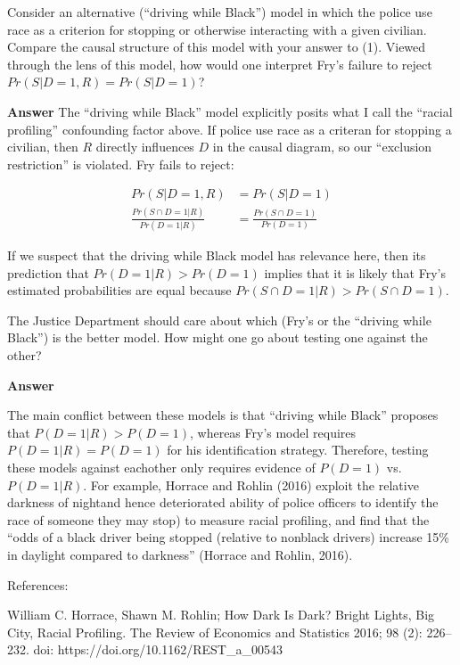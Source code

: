 \documentclass[11pt]{exam}
\begin{document}
\begin{questions}
    \question Consider an alternative (``driving while Black'') model in
which the police use race as a criterion for stopping or otherwise
interacting with a given civilian. Compare the causal structure of this
model with your answer to (1). Viewed through the lens of this model,
how would one interpret Fry's failure to reject
\(Pr(S|D = 1, R) = Pr(S|D = 1)\)?

\textbf{Answer} The ``driving while Black'' model explicitly posits what
I call the ``racial profiling'' confounding factor above. If police use
race as a criteran for stopping a civilian, then \(R\) directly
influences \(D\) in the causal diagram, so our ``exclusion restriction''
is violated. Fry fails to reject:

\begin{align*} Pr(S|D = 1, R) &= Pr(S|D = 1) \\ \frac{Pr(S\cap D = 1|R)}{Pr(D=1|R)} &= \frac{Pr(S\cap D = 1)}{Pr(D=1)} \end{align*}

If we suspect that the driving while Black model has relevance here,
then its prediction that \(Pr(D=1|R) > Pr(D=1)\) implies that it is
likely that Fry's estimated probabilities are equal because
\(Pr(S\cap D = 1|R) > Pr(S\cap D = 1)\).

    \question The Justice Department should care about which (Fry's or
the ``driving while Black'') is the better model. How might one go about
testing one against the other?

\textbf{Answer}

The main conflict between these models is that ``driving while Black''
proposes that \(P(D = 1 | R) > P(D = 1)\), whereas Fry's model requires
\(P(D = 1 | R)= P(D = 1)\) for his identification strategy. Therefore,
testing these models against eachother only requires evidence of
\(P(D=1)\) vs.~\(P(D=1|R)\). For example, Horrace and Rohlin (2016)
exploit the relative darkness of nightand hence deteriorated ability of
police officers to identify the race of someone they may stop) to
measure racial profiling, and find that the ``odds of a black driver
being stopped (relative to nonblack drivers) increase 15\% in daylight
compared to darkness'' (Horrace and Rohlin, 2016).

References:

William C. Horrace, Shawn M. Rohlin; How Dark Is Dark? Bright Lights,
Big City, Racial Profiling. The Review of Economics and Statistics 2016;
98 (2): 226--232. doi: https://doi.org/10.1162/REST\_a\_00543

\end{questions}
\end{document}
